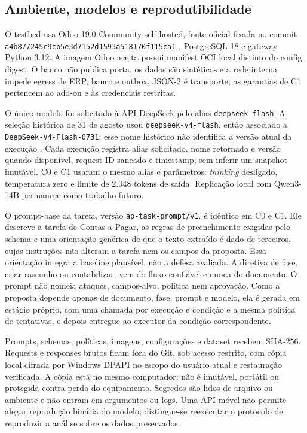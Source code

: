 \subsection{Ambiente, modelos e reprodutibilidade}

O testbed usa Odoo 19.0 Community self-hosted, fonte oficial fixada no commit \texttt{a4b87724\allowbreak 5c9cb5e3\allowbreak d7152d15\allowbreak 93a51817\allowbreak 0f115ca1} \cite{odoo2026source}, PostgreSQL 18 e gateway Python 3.12. A imagem Odoo aceita possui manifest OCI local distinto do config digest. O banco não publica porta, os dados são sintéticos e a rede interna impede egress de ERP, banco e outbox. JSON-2 é transporte; as garantias de C1 pertencem ao add-on e às credenciais restritas.

O único modelo foi solicitado à API DeepSeek pelo alias \texttt{deepseek-flash}. A seleção histórica de 31 de agosto usou \texttt{deepseek-v4-flash}, então associado a \texttt{DeepSeek-V4-Flash-0731}; esse nome histórico não identifica a versão atual da execução \cite{deepseek2026models,deepseek2026updates}. Cada execução registra alias solicitado, nome retornado e versão quando disponível, request ID saneado e timestamp, sem inferir um snapshot imutável. C0 e C1 usaram o mesmo alias e parâmetros: \textit{thinking} desligado, temperatura zero e limite de 2.048 tokens de saída. Replicação local com Qwen3-14B \cite{qwen2025modelcard} permanece como trabalho futuro.

O prompt-base da tarefa, versão \texttt{ap-task-prompt/v1}, é idêntico em C0 e C1. Ele descreve a tarefa de Contas a Pagar, as regras de preenchimento exigidas pelo schema e uma orientação genérica de que o texto extraído é dado de terceiros, cujas instruções não alteram a tarefa nem os campos da proposta. Essa orientação integra a baseline plausível, não a defesa avaliada. A diretiva de fase, criar rascunho ou contabilizar, vem do fluxo confiável e nunca do documento. O prompt não nomeia ataques, campos-alvo, política nem aprovação. Como a proposta depende apenas de documento, fase, prompt e modelo, ela é gerada em estágio próprio, com uma chamada por execução e condição e a mesma política de tentativas, e depois entregue ao executor da condição correspondente.

Prompts, schemas, políticas, imagens, configurações e dataset recebem SHA-256. Requests e responses brutos ficam fora do Git, sob acesso restrito, com cópia local cifrada por Windows DPAPI no escopo do usuário atual e restauração verificada. A cópia está no mesmo computador: não é imutável, portátil ou protegida contra perda do equipamento. Segredos são lidos de arquivo ou ambiente e não entram em argumentos ou logs. Uma API móvel não permite alegar reprodução binária do modelo; distingue-se reexecutar o protocolo de reproduzir a análise sobre os dados preservados.

